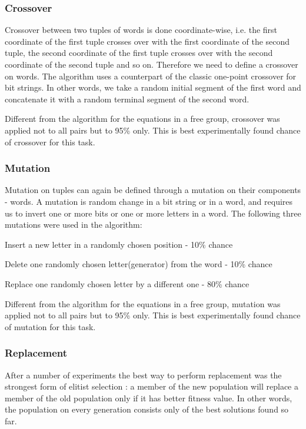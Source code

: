 \documentclass{article}
\begin{document}
    \subsubsection{Crossover}

Crossover between two tuples of words is done coordinate-wise,
i.e. the first coordinate of the first tuple crosses over with the
first coordinate of the second tuple, the second coordinate of the
first tuple crosses over with the second coordinate of the second
tuple and so on. Therefore we need to define a crossover on words. The
algorithm uses a counterpart of the classic one-point crossover for
bit strings. In other words, we take a random initial segment of the
first word and concatenate it with a random terminal segment of the
second word.

Different from the algorithm for the equations in a free group,
crossover was applied not to all pairs but to 95\% only. This is best
experimentally found chance of crossover for this task.

    \subsubsection{Mutation}

Mutation on tuples can again be defined through a mutation on their
components - words. A mutation is random change in a bit string or in
a word, and requires us to invert one or more bits or one or more
letters in a word. The following three mutations were used in the
algorithm:

Insert a new letter in a randomly chosen position - 10\% chance
 
Delete one randomly chosen letter(generator) from the word -  10\% chance

Replace one randomly chosen letter by a different one -  80\% chance

\noindent
Different from the algorithm for the equations in a free group,
mutation was applied not to all pairs but to 95\% only. This is best
experimentally found chance of mutation for this task.


    \subsubsection{Replacement}

After a number of experiments the best way to perform replacement was
the strongest form of elitist selection \cite {Philips} : a member of the new
population will replace a member of the old population only if it has
better fitness value. In other words, the population on every
generation consists only of the best solutions found so far.
\end{document}
